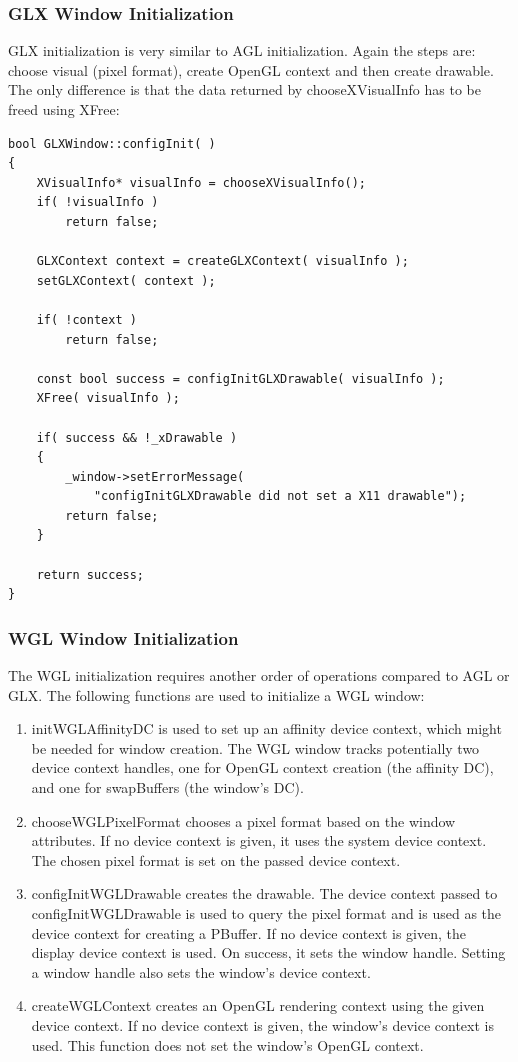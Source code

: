 \documentclass[10pt,a4]{scrartcl}
\begin{document}
\subsubsection{GLX Window Initialization}

GLX initialization is very similar to AGL initialization. Again the
steps are: choose visual (pixel format), create OpenGL context and then
create drawable. The only difference is that the data returned by
\textsf{chooseXVisualInfo} has to be freed using \textsf{XFree}:

{\footnotesize\begin{lstlisting}
bool GLXWindow::configInit( )
{
    XVisualInfo* visualInfo = chooseXVisualInfo();
    if( !visualInfo )
        return false;

    GLXContext context = createGLXContext( visualInfo );
    setGLXContext( context );

    if( !context )
        return false;

    const bool success = configInitGLXDrawable( visualInfo );
    XFree( visualInfo );

    if( success && !_xDrawable )
    {
        _window->setErrorMessage( 
            "configInitGLXDrawable did not set a X11 drawable");
        return false;
    }

    return success;    
}
\end{lstlisting}}


\subsubsection{WGL Window Initialization}

The WGL initialization requires another order of operations compared to
AGL or GLX. The following functions are used to initialize a WGL window:

\begin{enumerate}
\item\textsf{initWGLAffinityDC} is used to set up an affinity device
  context, which might be needed for window creation. The WGL window
  tracks potentially two device context handles, one for OpenGL context
  creation (the affinity DC), and one for \textsf{swapBuffers} (the
  window's DC).
\item\textsf{chooseWGLPixelFormat} chooses a pixel format based on the
  window attributes. If no device context is given, it uses the system
  device context. The chosen pixel format is set on the passed device
  context.
\item\textsf{configInitWGLDrawable} creates the drawable. The device
  context passed to \textsf{configInitWGLDrawable} is used to query the
  pixel format and is used as the device context for creating a
  PBuffer. If no device context is given, the display device context is
  used. On success, it sets the window handle. Setting a window handle
  also sets the window's device context.
\item\textsf{createWGLContext} creates an OpenGL rendering context using
  the given device context. If no device context is given, the window's
  device context is used. This function does not set the window's OpenGL
  context.
\end{enumerate}
\end{document}
